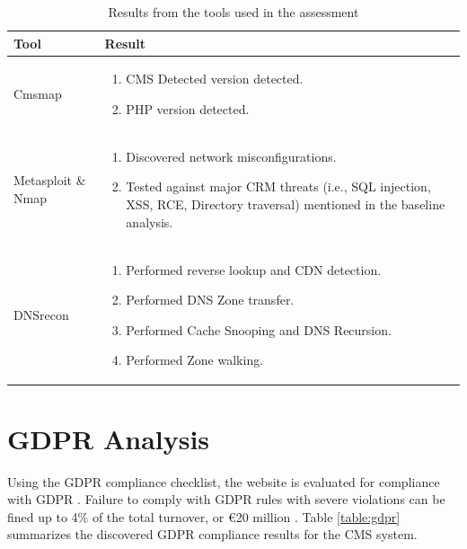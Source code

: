 \begingroup
\centering
\setlength{\tabcolsep}{6.5pt} %
\renewcommand{\arraystretch}{1.8} %
\begin{longtable}{ |p{5cm}| p{10cm} |}
\caption{Results from the tools used in the assessment}
    \label{table:tools}
\hline
\rowcolor{grey!15}
\textbf{Tool}  & \textbf{Result}\\
\hline
Cmsmap &  \begin{enumerate}
    \item CMS Detected version detected.
    \item PHP version detected.
\end{enumerate}\\
\hline
Metasploit \& Nmap &  \begin{enumerate}
    \item Discovered network misconfigurations.
    \item Tested against major CRM threats (i.e., SQL injection, XSS, RCE, Directory traversal) mentioned in the baseline analysis.
\end{enumerate}\\
\hline
DNSrecon &  \begin{enumerate}
    \item Performed reverse lookup and CDN detection.
    \item Performed DNS Zone transfer.
    \item Performed Cache Snooping and DNS Recursion.
    \item Performed Zone walking.
\end{enumerate}\\
\hline
\end{longtable}
\endgroup

\section{GDPR Analysis}
Using the GDPR compliance checklist, the website is evaluated for compliance with GDPR \citep{gdpr_checklist}. Failure to comply with GDPR rules with severe violations can be fined up to 4\% of the total turnover, or €20 million \citep[p.~32]{eu_fines}. Table \ref{table:gdpr} summarizes the discovered GDPR compliance results for the CMS system.

